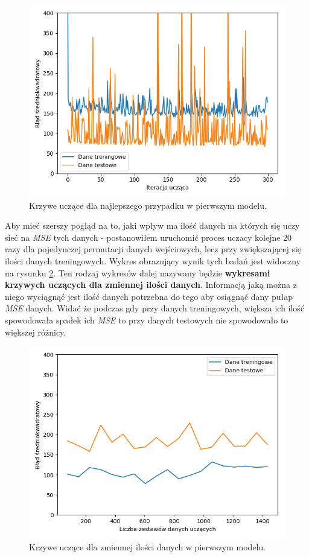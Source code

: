 \documentclass[12pt]{aghdpl}
\newenvironment{tightcenter}{
  \setlength\topsep{0pt}
  \setlength\parskip{0pt}
  \begin{center}
}{
  \end{center}
}
\begin{document}
		\begin{figure}[h]
	 		\begin{tightcenter}
	 			\includegraphics[width = 0.75\linewidth]{wykresy/1_pierwszy_model_tworzenie_i_analiza/wykres_uczenia.png}
	 		\end{tightcenter}
	 		
 			\caption{Krzywe uczące dla najlepszego przypadku w pierwszym modelu.}
			\label{fig: pierwszy_model_wykres_uczenia}
		\end{figure}
		
		Aby mieć szerszy pogląd na to, jaki wpływ ma ilość danych na których się uczy sieć na \textit{MSE} tych danych - postanowiłem uruchomić proces uczacy kolejne 20 razy dla pojedynczej permutacji danych wejściowych, lecz przy zwiększającej się ilości danych treningowych. Wykres obrazujący wynik tych badań jest widoczny na rysunku \ref{fig: pierwszy_model_learning_curves}. Ten rodzaj wykresów dalej nazywany będzie \textbf{wykresami krzywych uczących dla zmiennej ilości danych}. Informacją jaką można z niego wyciągnąć jest ilość danych potrzebna do tego aby osiągnąć dany pułap \textit{MSE} danych. Widać że podczas gdy przy danych treningowych, większa ich ilość spowodowała spadek ich \textit{MSE} to przy danych testowych nie spowodowało to większej różnicy.
		
		\begin{figure}[h]
	 		\begin{tightcenter}
	 			\includegraphics[width = 0.75\linewidth]{wykresy/1_pierwszy_model_tworzenie_i_analiza/learning_curves.png}
	 		\end{tightcenter}
	 		
 			\caption{Krzywe uczące dla zmiennej ilości danych w pierwszym modelu.}
			\label{fig: pierwszy_model_learning_curves}
		\end{figure}
		
\end{document}
